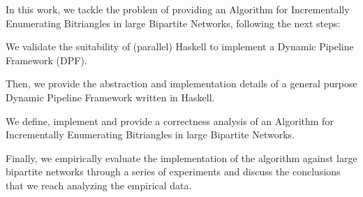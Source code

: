 \documentclass[thesis]{Thesis}
\begin{document}
{In this work, we tackle the problem of providing an Algorithm for Incrementally Enumerating Bitriangles in large Bipartite Networks, following the next steps:
  \begin{inparaenum}[\bf i\upshape)]
      \item We validate the suitability of (parallel) Haskell to implement a Dynamic Pipeline Framework (DPF).
      \item Then, we provide the abstraction and implementation details of a general purpose Dynamic Pipeline Framework written in Haskell.
      \item We define, implement and provide a correctness analysis of an Algorithm for Incrementally Enumerating Bitriangles in large Bipartite Networks. 
      \item Finally, we empirically evaluate the implementation of the algorithm against large bipartite networks through a series of experiments and discuss the conclusions that we reach analyzing the empirical data.
  \end{inparaenum}%
}










\appendix




\end{document}
